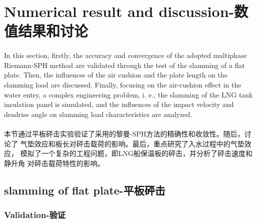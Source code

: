 \documentclass[UTF8]{ctexart}
\begin{document}
\section{Numerical result and discussion-数值结果和讨论}
\paragraph{\quad}In this section, firstly, the accuracy and convergence 
            of the adopted multiphase Riemann-SPH method are validated 
            through the test of the slamming of a flat plate. Then, 
            the influences of the air cushion and the plate length on the 
            slamming load are discussed. Finally, focusing on the air-cushion 
            effect in the water entry, a complex engineering problem, i. e., 
            the slamming of the LNG tank insulation panel is simulated, and the 
            influences of the impact velocity and deadrise angle on slamming load 
            characteristics are analyzed.
\paragraph{\quad}本节通过平板砰击实验验证了采用的黎曼-SPH方法的精确性和收敛性。随后，讨论了
                气垫效应和板长对砰击载荷的影响。最后，重点研究了入水过程中的气垫效应，
                模拟了一个复杂的工程问题，即LNG船保温板的砰击，并分析了砰击速度和静升角
                对砰击载荷特性的影响。

\subsection{slamming of flat plate-平板砰击}
\subsubsection{Validation-验证}
\end{document}
